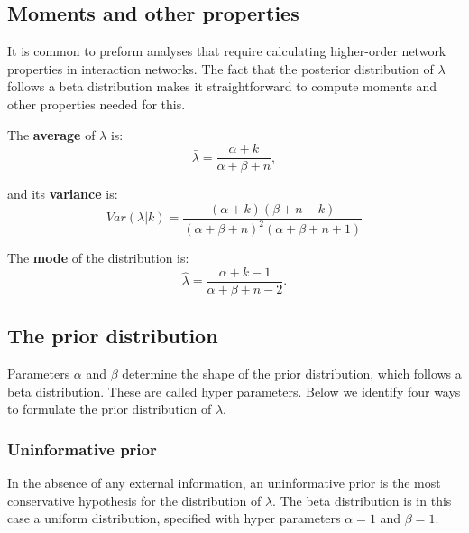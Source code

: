 \documentclass[12pt]{article}
\begin{document}
\begin{spacing}{2.0}
    \subsection*{Moments and other properties}

      It is common to preform analyses that require calculating higher-order network properties in interaction networks. The fact that the posterior distribution of $\lambda$ follows a beta distribution makes it straightforward to compute moments and other properties needed for this. 


      The \textbf{average} of $\lambda$ is: 
          \begin{equation}
            \bar{\lambda} = \frac{\alpha+k}{\alpha+\beta+n} ,
            \label{mean}
          \end{equation}

        and its \textbf{variance} is:  
          \begin{equation}
            Var(\lambda|k) = \frac{(\alpha + k)(\beta + n - k)}{(\alpha + \beta + n)^{2}(\alpha + \beta + n +1)}
            \label{variance}
          \end{equation}

        The \textbf{mode} of the distribution is:
          \begin{equation}
            \hat{\lambda} = \frac{\alpha + k - 1}{\alpha + \beta + n - 2} .
            \label{mode}
          \end{equation}

    \subsection*{The prior distribution}    

      Parameters $\alpha$ and $\beta$ determine the shape of the prior distribution, which follows a beta distribution. These are called hyper parameters. Below we identify four ways to formulate the prior distribution of $\lambda$. 

      \subsubsection*{Uninformative prior}
        
          In the absence of any external information, an uninformative prior is the most conservative hypothesis for the distribution of $\lambda$. The beta distribution is in this case a uniform distribution, specified with hyper parameters $\alpha=1$ and $\beta=1$. 


\end{spacing}
\end{document}
